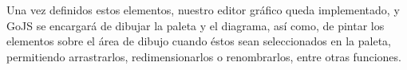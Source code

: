 Una vez definidos estos elementos, nuestro editor gráfico queda implementado, y GoJS se encargará de dibujar la paleta y el diagrama, así como, de pintar los elementos sobre el área de dibujo cuando éstos sean seleccionados en la paleta, permitiendo arrastrarlos, redimensionarlos o renombrarlos, entre otras funciones.